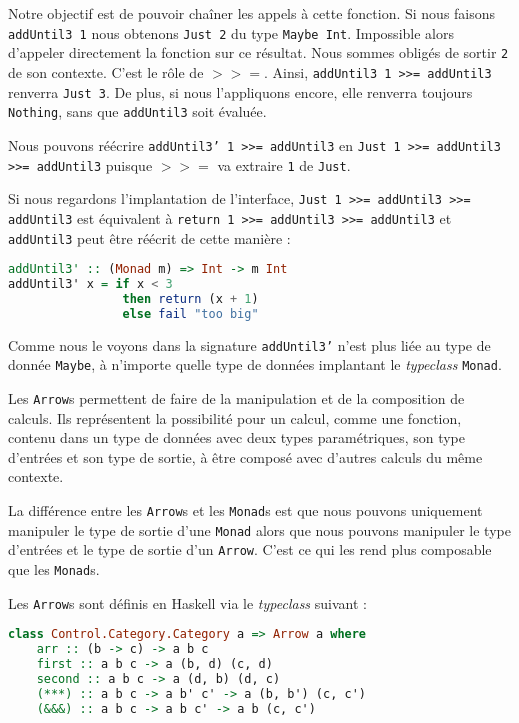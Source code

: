 \documentclass{llncs}
\newcommand{\Arrp}{\texttt{Arrow}. }
\newcommand{\Arrs}{\texttt{Arrow}s }
\begin{document}
Notre objectif est de pouvoir chaîner les appels à cette fonction.
Si nous faisons \texttt{addUntil3 1} nous obtenons \texttt{Just 2} du type \texttt{Maybe Int}.
Impossible alors d'appeler directement la fonction sur ce résultat.
Nous sommes obligés de sortir \texttt{2} de son contexte.
C'est le rôle de $>>=$.
Ainsi, \texttt{addUntil3 1 >>= addUntil3} renverra \texttt{Just 3}.
De plus, si nous l'appliquons encore, elle renverra toujours \texttt{Nothing},
sans que \texttt{addUntil3} soit évaluée.

Nous pouvons réécrire \texttt{addUntil3' 1 >>= addUntil3} en \texttt{Just 1 >>= addUntil3 >>= addUntil3}
puisque $>>=$ va extraire \texttt{1} de \texttt{Just}.

Si nous regardons l'implantation de l'interface, \texttt{Just 1 >>= addUntil3 >>= addUntil3}
est équivalent à \texttt{return 1 >>= addUntil3 >>= addUntil3} et \texttt{addUntil3}
peut être réécrit de cette manière :
\begin{lstlisting}[language=haskell]
addUntil3' :: (Monad m) => Int -> m Int
addUntil3' x = if x < 3
                then return (x + 1)
                else fail "too big"
\end{lstlisting}

Comme nous le voyons dans la signature \texttt{addUntil3'} n'est plus liée au type
de donnée \texttt{Maybe}, à n'importe quelle type de données implantant le \emph{typeclass}
\texttt{Monad}.

Les \Arrs permettent de faire de la manipulation et de la composition de calculs.
Ils représentent la possibilité pour un calcul, comme une fonction, contenu dans un
type de données avec deux types paramétriques, son type d'entrées et son type de sortie,
à être composé avec d'autres calculs du même contexte.

La différence entre les \Arrs et les \texttt{Monad}s est que nous pouvons
uniquement manipuler le type de sortie d'une \texttt{Monad} alors que nous pouvons
manipuler le type d'entrées et le type de sortie d'un \Arrp
C'est ce qui les rend plus composable que les \texttt{Monad}s.

Les \Arrs sont définis en Haskell via le \emph{typeclass} suivant :
\begin{lstlisting}[language=haskell]
class Control.Category.Category a => Arrow a where
    arr :: (b -> c) -> a b c
    first :: a b c -> a (b, d) (c, d)
    second :: a b c -> a (d, b) (d, c)
    (***) :: a b c -> a b' c' -> a (b, b') (c, c')
    (&&&) :: a b c -> a b c' -> a b (c, c')
\end{lstlisting}
\end{document}
